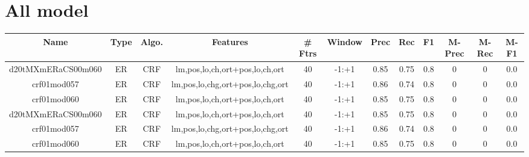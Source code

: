 \documentclass[a4paper]{article}
\begin{document}
\begin{landscape}
\begin{center}
\begin{tabular}{ |c|c|c|c|c|c|c|c|c|c|c|c|}
 	
 
 	
 
 	
 
 	
 
 	
 
 	
 
 	
 
 	
 
 \hline
\end{tabular}
\end{center}



\section{All model }


\begin{center}
\begin{tabular}{ |c|c|c|c|c|c|c|c|c|c|c|c|} 
 \hline
 	Name & Type & Algo. & Features & \# Ftrs & Window & Prec & Rec & F1 & M-Prec & M-Rec & M-F1\\
 \hline
 
 	
 	\small{ d20tMXmERaCS00m060 } & ER & CRF & lm,pos,lo,ch,ort+pos,lo,ch,ort  &  40 &  -1:+1  &  0.85 & 0.75 & 0.8  &  0 & 0 & 0.0 \\
 	

 
 	
 	\small{ crf01mod057 } & ER & CRF & lm,pos,lo,chg,ort+pos,lo,chg,ort  &  40 &  -1:+1  &  0.86 & 0.74 & 0.8  &  0 & 0 & 0.0 \\
 	

 
 	
 	\small{ crf01mod060 } & ER & CRF & lm,pos,lo,ch,ort+pos,lo,ch,ort  &  40 &  -1:+1  &  0.85 & 0.75 & 0.8  &  0 & 0 & 0.0 \\
 	

 
 	
 	\small{ d20tMXmERaCS00m060 } & ER & CRF & lm,pos,lo,ch,ort+pos,lo,ch,ort  &  40 &  -1:+1  &  0.85 & 0.75 & 0.8  &  0 & 0 & 0.0 \\
 	

 
 	
 	\small{ crf01mod057 } & ER & CRF & lm,pos,lo,chg,ort+pos,lo,chg,ort  &  40 &  -1:+1  &  0.86 & 0.74 & 0.8  &  0 & 0 & 0.0 \\
 	

 
 	
 	\small{ crf01mod060 } & ER & CRF & lm,pos,lo,ch,ort+pos,lo,ch,ort  &  40 &  -1:+1  &  0.85 & 0.75 & 0.8  &  0 & 0 & 0.0 \\
 	


\end{tabular}
\end{center}
\end{landscape}
\end{document}
